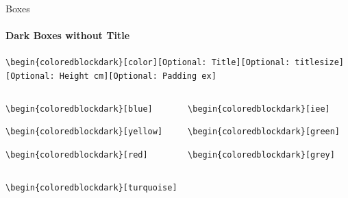 \documentclass[aspectratio=169]{beamer}
\begin{document}
\begin{frame}{Boxes}
    \framesubtitle{Dark Boxes without Title}

    \begin{coloredblock}[grey]
        \footnotesize\centering\texttt{\textbackslash begin\{coloredblockdark\}[color][Optional:~Title][Optional:~titlesize][Optional:~Height cm][Optional:~Padding ex]}
    \end{coloredblock}

    \vspace{-1.1cm}
    \begin{columns}
        \begin{column}{0.49\textwidth}

            \begin{coloredblockdark}[blue]
                \footnotesize\texttt{\textbackslash begin\{coloredblockdark\}[blue]}\strut
            \end{coloredblockdark}
    
            \begin{coloredblockdark}[yellow]
                \footnotesize\texttt{\textbackslash begin\{coloredblockdark\}[yellow]}\strut
            \end{coloredblockdark}
    
            \begin{coloredblockdark}[red]
                \footnotesize\texttt{\textbackslash begin\{coloredblockdark\}[red]}\strut
            \end{coloredblockdark}

        \end{column}
        \begin{column}{0.49\textwidth}
        
            \begin{coloredblockdark}[iee]
                \footnotesize\texttt{\textbackslash begin\{coloredblockdark\}[iee]}\strut
            \end{coloredblockdark}
    
            \begin{coloredblockdark}[green]
                \footnotesize\texttt{\textbackslash begin\{coloredblockdark\}[green]}\strut
            \end{coloredblockdark}
    
            \begin{coloredblockdark}[grey]
                \footnotesize\texttt{\textbackslash begin\{coloredblockdark\}[grey]}\strut
            \end{coloredblockdark}
        
        \end{column}
    \end{columns}

    \centering
    \begin{minipage}[t]{0.49\textwidth}
        \begin{coloredblockdark}[turquoise]
                \footnotesize\texttt{\textbackslash begin\{coloredblockdark\}[turquoise]}\strut
        \end{coloredblockdark}
        
    \end{minipage}
\end{frame}
\end{document}

